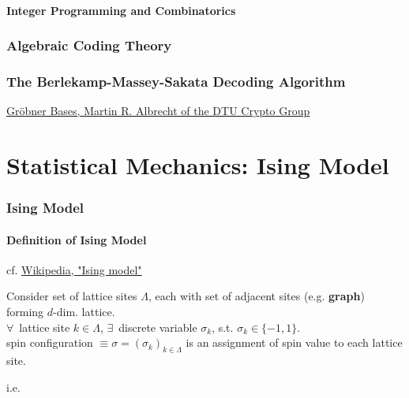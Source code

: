 \documentclass[10pt]{amsart}
\begin{document}
\begin{multicols*}{2}
\subsection{Integer Programming and Combinatorics}



\section{Algebraic Coding Theory}


\section{The Berlekamp-Massey-Sakata Decoding Algorithm}





\href{https://martinralbrecht.files.wordpress.com/2010/07/20131022_buchberger_dtu.pdf}{Gr\"{o}bner Bases, Martin R. Albrecht of the DTU Crypto Group}

\part{Statistical Mechanics: Ising Model}  

\section{Ising Model}  

\subsection{Definition of Ising Model}  

cf. \href{https://en.wikipedia.org/wiki/Ising_model}{Wikipedia, "Ising model"}

Consider set of lattice sites $\Lambda$, each with set of adjacent sites (e.g. \textbf{graph}) forming $d$-dim. lattice.  \\
$\forall \, $ lattice site $k\in \Lambda$, $\exists \, $ discrete variable $\sigma_k$, s.t. $\sigma_k \in \lbrace -1, 1\rbrace$.  \\
spin configuration $\equiv \sigma = (\sigma_k)_{k\in \Lambda}$ is an assignment of spin value to each lattice site.  

i.e. 


\end{multicols*}
\end{document}
